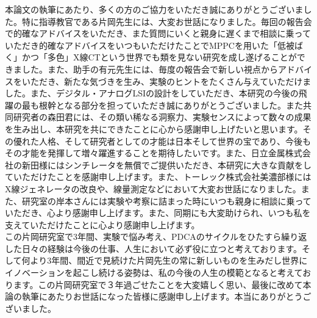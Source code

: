 \begin{acknowledgment}
本論文の執筆にあたり、多くの方のご協力をいただき誠にありがとうございました。特に指導教官である片岡先生には、大変お世話になりました。毎回の報告会で的確なアドバイスをいただき、また質問にいくと親身に遅くまで相談に乗っていただき的確なアドバイスをいつもいただけたことでMPPCを用いた「低被ばく」かつ「多色」X線CTという世界でも類を見ない研究を成し遂げることができました。また、助手の有元先生には、毎度の報告会で新しい視点からアドバイスをいただき、新たな気づきを生み、実験のヒントをたくさん与えていただけました。また、デジタル・アナログLSIの設計をしていただき、本研究の今後の飛躍の最も根幹となる部分を担っていただき誠にありがとうございました。また共同研究者の森田君には、その類い稀なる洞察力、実験センスによって数々の成果を生み出し、本研究を共にできたことに心から感謝申し上げたいと思います。その優れた人格、そして研究者としての才能は日本そして世界の宝であり、今後もその才能を発揮して増々躍進することを期待したいです。また、日立金属株式会社の新田様にはシンチレータを無償でご提供いただき、本研究に大きな貢献をしていただけたことを感謝申し上げます。また、トーレック株式会社美濃部様にはX線ジェネレータの改良や、線量測定などにおいて大変お世話になりました。また、研究室の岸本さんには実験や考察に詰まった時にいつも親身に相談に乗っていただき、心より感謝申し上げます。また、同期にも大変助けられ、いつも私を支えていただけたことに心より感謝申し上げます。\\この片岡研究室で3年間、実験で悩み考え、PDCAのサイクルをひたすら繰り返した日々の経験は今後の仕事、人生において必ず役に立つと考えております。そして何より3年間、間近で見続けた片岡先生の常に新しいものを生みだし世界にイノベーションを起こし続ける姿勢は、私の今後の人生の模範となると考えております。この片岡研究室で３年過ごせたことを大変嬉しく思い、最後に改めて本論の執筆にあたりお世話になった皆様に感謝申し上げます。本当にありがとうございました。
\end{acknowledgment}
